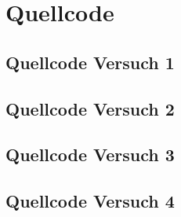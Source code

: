 \documentclass[12pt, oneside, a4paper, \docLanguage]{report}
\begin{document}
\section{Quellcode}
\label{chap:APPENDIX_SOURCECODE}

\pagebreak

\subsection{Quellcode Versuch 1}
\label{chap:APPENDIX_SOURCECODE_V1}

\pagebreak

\subsection{Quellcode Versuch 2}
\label{chap:APPENDIX_SOURCECODE_V2}


\pagebreak

\subsection{Quellcode Versuch 3}
\label{chap:APPENDIX_SOURCECODE_V3}

\pagebreak

\subsection{Quellcode Versuch 4}
\label{chap:APPENDIX_SOURCECODE_V4}

\pagebreak


%
%

\end{document}
